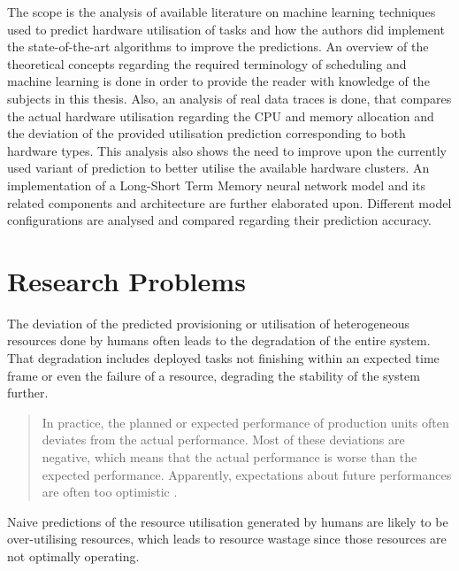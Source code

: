             The scope is the analysis of available literature on machine learning techniques used to predict hardware utilisation of tasks and how the authors did implement the state-of-the-art algorithms to improve the predictions.
            An overview of the theoretical concepts regarding the required terminology of scheduling and machine learning is done in order to provide the reader with knowledge of the subjects in this thesis.
            Also, an analysis of real data traces is done, that compares the actual hardware utilisation regarding the CPU and memory allocation and the deviation of the provided utilisation prediction corresponding to both hardware types. This analysis also shows the need to improve upon the currently used variant of prediction to better utilise the available hardware clusters. 
            An implementation of a Long-Short Term Memory neural network model and its related components and architecture are further elaborated upon. Different model configurations are analysed and compared regarding their prediction accuracy.


        \section{Research Problems}
        \label{sec:research-problems-introduction}

            The deviation of the predicted provisioning or utilisation of heterogeneous resources done by humans often leads to the degradation of the entire system. That degradation includes deployed tasks not finishing within an expected time frame or even the failure of a resource, degrading the stability of the system further.
            \begin{quote}
                In practice, the planned or expected performance of production units often deviates from the actual performance. Most of these deviations are negative, which means that the actual performance is worse than the expected performance. Apparently, expectations about future performances are often too optimistic \cite{stoopComplexitySchedulingPractice1996}.
            \end{quote}
            Naive predictions of the resource utilisation generated by humans are likely to be over-utilising resources, which leads to resource wastage since those resources are not optimally operating. 
            
